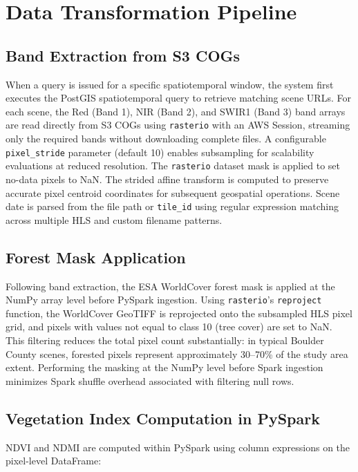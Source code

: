 \section{Data Transformation Pipeline}

\subsection{Band Extraction from S3 COGs}

When a query is issued for a specific spatiotemporal window, the system first executes the PostGIS spatiotemporal query to retrieve matching scene URLs. For each scene, the Red (Band 1), NIR (Band 2), and SWIR1 (Band 3) band arrays are read directly from S3 COGs using \texttt{rasterio} with an AWS Session, streaming only the required bands without downloading complete files. A configurable \texttt{pixel\_stride} parameter (default 10) enables subsampling for scalability evaluations at reduced resolution. The \texttt{rasterio} dataset mask is applied to set no-data pixels to NaN. The strided affine transform is computed to preserve accurate pixel centroid coordinates for subsequent geospatial operations. Scene date is parsed from the file path or \texttt{tile\_id} using regular expression matching across multiple HLS and custom filename patterns.

\subsection{Forest Mask Application}

Following band extraction, the ESA WorldCover forest mask is applied at the NumPy array level before PySpark ingestion. Using \texttt{rasterio}'s \texttt{reproject} function, the WorldCover GeoTIFF is reprojected onto the subsampled HLS pixel grid, and pixels with values not equal to class 10 (tree cover) are set to NaN. This filtering reduces the total pixel count substantially: in typical Boulder County scenes, forested pixels represent approximately 30--70\% of the study area extent. Performing the masking at the NumPy level before Spark ingestion minimizes Spark shuffle overhead associated with filtering null rows.

\subsection{Vegetation Index Computation in PySpark}

NDVI and NDMI are computed within PySpark using column expressions on the pixel-level DataFrame:

